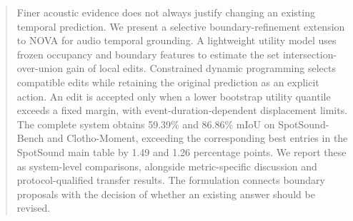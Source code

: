 \begin{abstract}
Finer acoustic evidence does not always justify changing an existing temporal prediction. We present a selective boundary-refinement extension to NOVA for audio temporal grounding. A lightweight utility model uses frozen occupancy and boundary features to estimate the set intersection-over-union gain of local edits. Constrained dynamic programming selects compatible edits while retaining the original prediction as an explicit action. An edit is accepted only when a lower bootstrap utility quantile exceeds a fixed margin, with event-duration-dependent displacement limits. The complete system obtains 59.39\% and 86.86\% mIoU on SpotSound-Bench and Clotho-Moment, exceeding the corresponding best entries in the SpotSound main table by 1.49 and 1.26 percentage points. We report these as system-level comparisons, alongside metric-specific discussion and protocol-qualified transfer results. The formulation connects boundary proposals with the decision of whether an existing answer should be revised.
\end{abstract}
